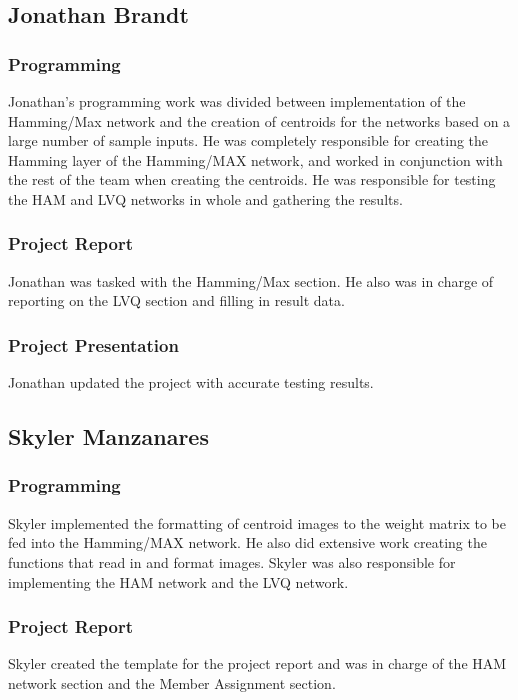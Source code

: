 \documentclass{article}
\begin{document}
\subsection{Jonathan Brandt}
\subsubsection{Programming}
Jonathan's programming work was divided between implementation of the 
Hamming/Max network and the creation of centroids for the networks based on a
large number of sample inputs. He was completely responsible for creating the Hamming layer of the Hamming/MAX network, and worked in conjunction with the rest of the team when creating the centroids. He was responsible for testing the HAM and LVQ networks in whole and gathering the results.

\subsubsection{Project Report}
Jonathan was tasked with the Hamming/Max section. He also was in charge of reporting on the LVQ section and filling in result data.

\subsubsection{Project Presentation}
Jonathan updated the project with accurate testing results. 

\subsection{Skyler Manzanares}

\subsubsection{Programming}
Skyler implemented the formatting of centroid images to the weight matrix to be fed into the Hamming/MAX network. He also did extensive work creating the functions that read in and format images. Skyler was also responsible for implementing
the HAM network and the LVQ network.

\subsubsection{Project Report}
Skyler created the template for the project report and was in charge of the HAM 
network section and the Member Assignment section.
\end{document}
